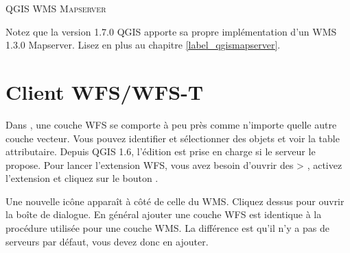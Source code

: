 \begin{Tip}[ht]\caption{\textsc{QGIS WMS Mapserver}}
Notez que la version 1.7.0 QGIS apporte sa propre implémentation d'un WMS 1.3.0 Mapserver.
Lisez en plus au chapitre \ref{label_qgismapserver}.
\end{Tip}

\section{Client WFS/WFS-T}\label{sec:ogc-wfs}


Dans \qg, une couche WFS se comporte à peu près comme n'importe quelle autre couche vecteur. Vous pouvez identifier et sélectionner des objets et voir la table attributaire. Depuis QGIS 1.6, l'édition est prise en charge si le serveur le propose. Pour lancer l'extension WFS, vous avez besoin d'ouvrir des  > , activez l'extension  et cliquez sur le bouton .

Une nouvelle icône  apparaît à côté de celle du WMS. Cliquez dessus pour ouvrir la boîte de dialogue. En général ajouter une couche WFS est identique à la procédure utilisée pour une couche WMS. La différence est qu'il n'y a pas de serveurs par défaut, vous devez donc en ajouter.

